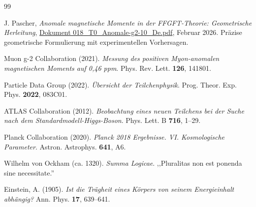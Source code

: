 \begin{thebibliography}{99}
		
		J. Pascher,
		\textit{Anomale magnetische Momente in der FFGFT-Theorie: Geometrische Herleitung},
		\href{https://github.com/jpascher/T0-Time-Mass-Duality/blob/main/2/pdf/018_T0_Anomale-g2-10_De.pdf}{Dokument 018\_T0\_Anomale-g2-10\_De.pdf},
		Februar 2026.
		Präzise geometrische Formulierung mit experimentellen Vorhersagen.
		
		Muon g-2 Collaboration (2021). \textit{Messung des positiven Myon-anomalen magnetischen Moments auf 0{,}46 ppm}. Phys. Rev. Lett. \textbf{126}, 141801.
		
		Particle Data Group (2022). \textit{Übersicht der Teilchenphysik}. Prog. Theor. Exp. Phys. \textbf{2022}, 083C01.
		
		ATLAS Collaboration (2012). \textit{Beobachtung eines neuen Teilchens bei der Suche nach dem Standardmodell-Higgs-Boson}. Phys. Lett. B \textbf{716}, 1--29.
		
		Planck Collaboration (2020). \textit{Planck 2018 Ergebnisse. VI. Kosmologische Parameter}. Astron. Astrophys. \textbf{641}, A6.
		
		Wilhelm von Ockham (ca. 1320). \textit{Summa Logicae}. ,,Pluralitas non est ponenda sine necessitate.''
		
		Einstein, A. (1905). \textit{Ist die Trägheit eines Körpers von seinem Energieinhalt abhängig?} Ann. Phys. \textbf{17}, 639--641.
		
	\end{thebibliography}
